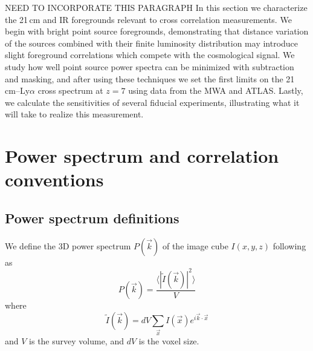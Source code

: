 \documentclass[preprint]{aastex}
\begin{document}
NEED TO INCORPORATE THIS PARAGRAPH
In this section we characterize the 21\,cm and IR foregrounds relevant to cross correlation measurements. We begin with bright point source foregrounds, demonstrating that distance variation of the sources combined with their finite luminosity distribution may introduce slight foreground correlations which compete with the cosmological signal. We study how well point source power spectra can be minimized with subtraction and masking, and after using these techniques we set the first limits on the 21\,cm--Ly$\alpha$ cross spectrum at $z=7$ using data from the MWA and ATLAS. Lastly, we calculate the sensitivities of several fiducial experiments, illustrating what it will take to realize this measurement.

\section{Power spectrum and correlation conventions}
\label{sec:pspecconventions}

\subsection{Power spectrum definitions}

We define the 3D power spectrum $P(\vec{k})$ of the image cube $I(x,y,z)$ following \citet{ewallwice14} as 
\begin{equation}
	P(\vec{k}) = \frac{\langle|\tilde{I}(\vec{k})|^2\rangle}{V}
\end{equation}
where
\begin{equation}
	\tilde{I}(\vec{k})=dV\sum_{\vec{x}}I(\vec{x})e^{i\vec{k}\cdot\vec{x}}
\end{equation}
and $V$ is the survey volume, and $dV$ is the voxel size.
\end{document}
